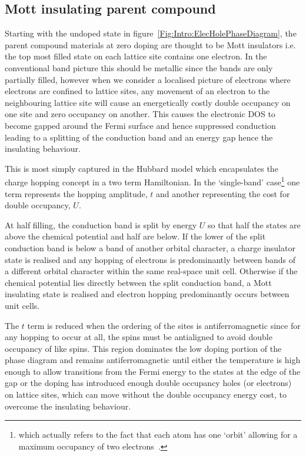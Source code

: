 \subsection{Mott insulating parent compound}

Starting with the undoped state in figure~\ref{Fig:Intro:ElecHolePhaseDiagram}, the parent compound materials at zero doping are thought to be Mott insulators i.e. the top most filled state on each lattice site contains one electron. In the conventional band picture this should be metallic since the bands are only partially filled, however when we consider a localised picture of electrons where electrons are confined to lattice sites, any movement of an electron to the neighbouring lattice site will cause an energetically costly double occupancy on one site and zero occupancy on another. This causes the electronic \ac{DOS} to become gapped around the Fermi surface and hence suppressed conduction leading to a splitting of the conduction band and an energy gap hence the insulating behaviour.

This is most simply captured in the Hubbard model which encapsulates the charge hopping concept in a two term Hamiltonian. In the `single-band' case\footnote{which actually refers to the fact that each atom has one `orbit' allowing for a maximum occupancy of two electrons~\cite{Tasaki1998}.} one term represents the hopping amplitude, $t$ and another representing the cost for double occupancy, $U$.  

At half filling, the conduction band is split by energy $U$ so that half the states are above the chemical potential and half are below. If the lower of the split conduction band is below a band of another orbital character, a charge insulator state is realised and any hopping of electrons is predominantly between bands of a different orbital character within the same real-space unit cell. Otherwise if the chemical potential lies directly between the split conduction band, a Mott insulating state is realised and electron hopping predominantly occurs between unit cells.

The $t$ term is reduced when the ordering of the sites is antiferromagnetic since for any hopping to occur at all, the spins must be antialigned to avoid double occupancy of like spins. This region dominates the low doping portion of the phase diagram and remains antiferromagnetic until either the temperature is high enough to allow transitions from the Fermi energy to the states at the edge of the gap or the doping has introduced enough double occupancy holes (or electrons) on lattice sites, which can move without the double occupancy energy cost, to overcome the insulating behaviour.


